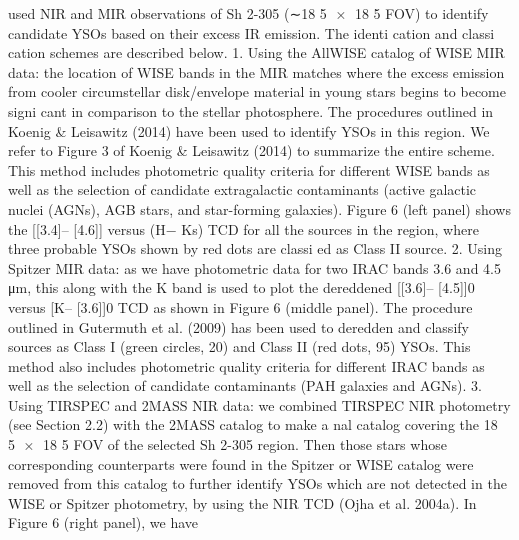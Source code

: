 \documentclass[../Main.tex]{subfiles}
\begin{document}
{used NIR and MIR observations of Sh 2-305 (∼18 5
×
18 5
FOV) to identify candidate YSOs based on their excess IR
emission. The identi cation and classi cation schemes are
described below.
1. Using the AllWISE catalog of WISE MIR data: the location
of WISE bands in the MIR matches where the excess
emission from cooler circumstellar disk/envelope material
in young stars begins to become signi cant in comparison
to the stellar photosphere. The procedures outlined in
Koenig & Leisawitz (2014) have been used to identify
YSOs in this region. We refer to Figure 3 of Koenig &
Leisawitz (2014) to summarize the entire scheme. This
method includes photometric quality criteria for different
WISE bands as well as the selection of candidate
extragalactic contaminants (active galactic nuclei (AGNs),
AGB stars, and star-forming galaxies). Figure 6 (left panel)
shows the [[3.4]– [4.6]] versus (H− Ks) TCD for all the
sources in the region, where three probable YSOs shown by
red dots are classi ed as Class II source.
2. Using Spitzer MIR data: as we have photometric data for
two IRAC bands 3.6 and 4.5 μm, this along with the K
band is used to plot the dereddened [[3.6]– [4.5]]0 versus
[K– [3.6]]0 TCD as shown in Figure 6 (middle panel).
The procedure outlined in Gutermuth et al. (2009) has
been used to deredden and classify sources as Class I
(green circles, 20) and Class II (red dots, 95) YSOs. This
method also includes photometric quality criteria for
different IRAC bands as well as the selection of candidate
contaminants (PAH galaxies and AGNs).
3. Using TIRSPEC and 2MASS NIR data: we combined
TIRSPEC NIR photometry (see Section 2.2) with the
2MASS catalog to make a nal catalog covering the
18 5
×
18 5 FOV of the selected Sh 2-305 region. Then
those stars whose corresponding counterparts were found
in the Spitzer or WISE catalog were removed from this
catalog to further identify YSOs which are not detected in
the WISE or Spitzer photometry, by using the NIR TCD
(Ojha et al. 2004a). In Figure 6 (right panel), we have

}
\end{document}

